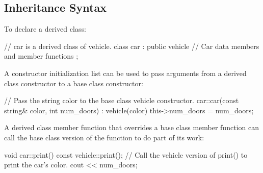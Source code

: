 \documentclass{report}
\begin{document}
    \subsection{Inheritance Syntax}
    \bigbreak \noindent 
    To declare a derived class:
    \bigbreak \noindent 
    \begin{cppcode}
        // car is a derived class of vehicle.
        class car : public vehicle
        {
            // Car data members and member functions
        };
    \end{cppcode}
    \bigbreak \noindent 
    A constructor initialization list can be used to pass arguments from a derived class constructor to a base class constructor:
    \bigbreak \noindent 
    \begin{cppcode}
        // Pass the string color to the base class vehicle constructor.
        car::car(const string& color, int num_doors) : vehicle(color)
        {
            this->num_doors = num_doors;
        }
    \end{cppcode}
    \bigbreak \noindent 
    A derived class member function that overrides a base class member function can call the base class version of the function to do part of its work:
    \begin{cppcode}
        void car::print() const
        {
            vehicle::print();   // Call the vehicle version of print() to print the car's color.
            cout << num_doors;
        }
    \end{cppcode}
    \bigbreak \noindent 
\end{document}
